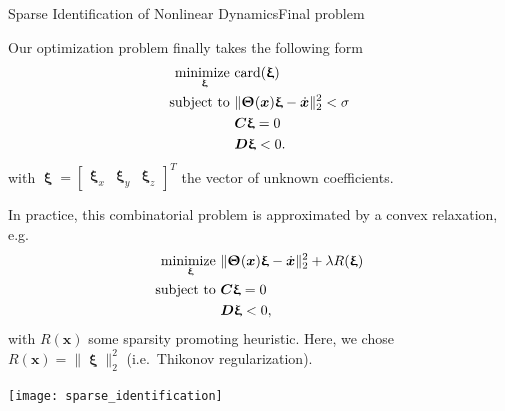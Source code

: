 \begin{frame}[t, c]{Sparse Identification of Nonlinear Dynamics}{Final problem}
  \begin{minipage}{.58\textwidth}
    \begin{overprint}
      Our optimization problem finally takes the following form
      \[
        \begin{aligned}
          \operatorname*{minimize~}_{\boldsymbol{\upxi}} & \text{card}(\boldsymbol{\upxi}) \\
          \operatorname*{subject~to~} & \| \boldsymbol{\Uptheta}(\bm{x}) \boldsymbol{\upxi} - \dot{\bm{x}} \|_2^2 < \sigma \\
          & \bm{C} \boldsymbol{\upxi} = 0 \\
          & \bm{D} \boldsymbol{\upxi} < 0.
        \end{aligned}
      \]
      with \( \boldsymbol{\upxi} = \begin{bmatrix} \boldsymbol{\upxi}_x & \boldsymbol{\upxi}_y & \boldsymbol{\upxi}_z \end{bmatrix}^T \) the vector of unknown coefficients.
      
      In practice, this combinatorial problem is approximated by a convex relaxation, e.g.
      \[
        \begin{aligned}
          \operatorname*{minimize~}_{\boldsymbol{\upxi}} & \| \boldsymbol{\Uptheta}(\bm{x}) \boldsymbol{\upxi} - \dot{\bm{x}} \|_2^2 + \lambda R(\boldsymbol{\upxi}) \\
          \operatorname*{subject~to~} & \bm{C} \boldsymbol{\upxi} = 0 \\
          & \bm{D} \boldsymbol{\upxi} < 0,
        \end{aligned}
      \]
      with \( R(\bm{x}) \) some sparsity promoting heuristic.
      Here, we chose \( R(\bm{x}) = \| \boldsymbol{\upxi} \|_2^2 \) (i.e.\ Thikonov regularization).
    \end{overprint}
  \end{minipage}%
  \hfill
  \begin{minipage}{.38\textwidth}
    \centering
    \texttt{[image: sparse\_identification]}
  \end{minipage}
  
  \vspace{1cm}
\end{frame}

